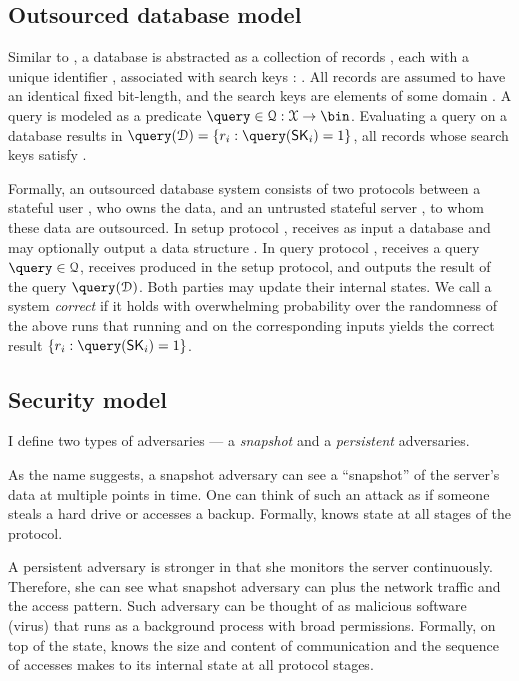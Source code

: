 		\subsection{Outsourced database model}\label{section:introduction:model:odb}

			Similar to \cite{epsolute}, a database is abstracted as a collection of \dataSize{} records \record{}, each with a unique identifier \recordID{}, associated with search keys \searchKey{}: \databaseDef{}.
			All records are assumed to have an identical fixed bit-length, and the search keys are elements of some domain \searchKeyDomain{}.
			A query is modeled as a predicate $\query \in \querySet: \searchKeyDomain \to \bin$.
			Evaluating a query \query{} on a database \database{} results in $\query( \database ) = \{ \record_i : \query( \searchKey_i ) = 1 \}$, all records whose search keys satisfy \query{}.

			Formally, an outsourced database system consists of two protocols between a stateful user \user{}, who owns the data, and an untrusted stateful server \server{}, to whom these data are outsourced.
			In setup protocol \protocolSetup{}, \user{} receives as input a database \databaseDef{} and \server{} may optionally output a data structure \serverDS{}.
			In query protocol \protocolQuery{}, \user{} receives a query $\query \in \querySet$, \server{} receives \serverDS{} produced in the setup protocol, and \user{} outputs the result of the query $\query( \database )$.
			Both parties may update their internal states.
			We call a system \emph{correct} if it holds with overwhelming probability over the randomness of the above runs that running \protocolSetup{} and  \protocolQuery{} on the corresponding inputs yields the correct result $\{ \record_i : \query( \searchKey_i ) = 1 \}$.

		\subsection{Security model}

			I define two types of adversaries --- a \emph{snapshot} and a \emph{persistent} adversaries.

			As the name suggests, a snapshot adversary can see a ``snapshot'' of the server's data at multiple points in time.
			One can think of such an attack as if someone steals a hard drive or accesses a backup.
			Formally, \adversary{} knows \server{} state at all stages of the protocol.

			A persistent adversary is stronger in that she monitors the server continuously.
			Therefore, she can see what snapshot adversary can plus the network traffic and the access pattern.
			Such adversary can be thought of as malicious software (virus) that runs as a background process with broad permissions.
			Formally, on top of the \server{} state, \adversary{} knows the size and content of \server{} communication and the sequence of accesses \server{} makes to its internal state at all protocol stages.

